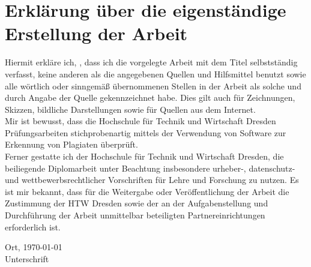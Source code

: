 %
\chapter*{Erklärung über die eigenständige Erstellung der Arbeit}%
Hiermit erkläre ich, \makeatletter \@author \makeatother , dass ich die vorgelegte Arbeit mit dem Titel \makeatletter \textsf{\@title} \makeatother selbstständig verfasst, keine anderen als die angegebenen Quellen und Hilfsmittel benutzt sowie alle wörtlich oder sinngemäß übernommenen Stellen in der Arbeit als solche und durch Angabe der Quelle gekennzeichnet habe. Dies gilt auch für Zeichnungen, Skizzen, bildliche Darstellungen sowie für Quellen aus dem Internet.\\%
Mir ist bewusst, dass die Hochschule für Technik und Wirtschaft Dresden Prüfungsarbeiten stichprobenartig mittels der Verwendung von Software zur Erkennung von Plagiaten überprüft.\\%
Ferner gestatte ich der Hochschule für Technik und Wirtschaft Dresden, die beiliegende Diplomarbeit unter Beachtung insbesondere urheber-, datenschutz- und wettbewerbsrechtlicher Vorschriften für Lehre und Forschung zu nutzen.
Es ist mir bekannt, dass für die Weitergabe oder Veröffentlichung der Arbeit die Zustimmung der HTW Dresden sowie der an der Aufgabenstellung und Durchführung der Arbeit unmittelbar beteiligten Partnereinrichtungen erforderlich ist.\\%

\vfill%

Ort, \today \hspace{35mm} \hrulefill \\
\hspace*{83mm} Unterschrift
\newpage